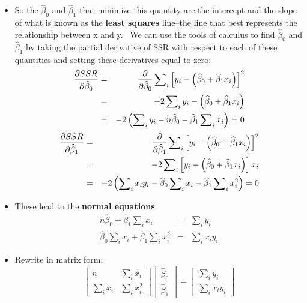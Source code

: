 \documentclass[11pt]{article}
\begin{document}
\begin{itemize}
\item So the $\widehat{\beta }_{0}$ and $\widehat{\beta }_{1}$ that minimize
this quantity are the intercept and the slope of what is known as the 
\textbf{least squares }line--the line that best represents the relationship
between x and y. \ We can use the tools of calculus to find $\widehat{\beta }%
_{0}$ and $\widehat{\beta }_{1}$ by taking the partial derivative of SSR
with respect to each of these quantities and setting these derivatives equal
to zero:%
\begin{eqnarray*}
\frac{\partial SSR}{\partial \widehat{\beta }_{0}} &=&\frac{\partial }{%
\partial \widehat{\beta }_{0}}\sum\nolimits_{i}\left[ y_{i}-\left( \widehat{%
\beta }_{0}+\widehat{\beta }_{1}x_{i}\right) \right] ^{2} \\
&=&-2\sum\nolimits_{i}y_{i}-\left( \widehat{\beta }_{0}+\widehat{\beta }%
_{1}x_{i}\right) \\
&=&-2\left( \sum\nolimits_{i}y_{i}-n\widehat{\beta }_{0}-\widehat{\beta }%
_{1}\sum\nolimits_{i}x_{i}\right) =0
\end{eqnarray*}%
\begin{eqnarray*}
\frac{\partial SSR}{\partial \widehat{\beta }_{1}} &=&\frac{\partial }{%
\partial \widehat{\beta }_{1}}\sum\nolimits_{i}\left[ y_{i}-\left( \widehat{%
\beta }_{0}+\widehat{\beta }_{1}x_{i}\right) \right] ^{2} \\
&=&-2\sum\nolimits_{i}\left[ y_{i}-\left( \widehat{\beta }_{0}+\widehat{%
\beta }_{1}x_{i}\right) \right] x_{i} \\
&=&-2\left( \sum\nolimits_{i}x_{i}y_{i}-\widehat{\beta }_{0}\sum%
\nolimits_{i}x_{i}-\widehat{\beta }_{1}\sum\nolimits_{i}x_{i}^{2}\right) =0
\end{eqnarray*}

\item These lead to the \textbf{normal equations}%
\begin{eqnarray*}
n\widehat{\beta }_{0}+\widehat{\beta }_{1}\sum\nolimits_{i}x_{i}
&=&\sum\nolimits_{i}y_{i} \\
\widehat{\beta }_{0}\sum\nolimits_{i}x_{i}+\widehat{\beta }%
_{1}\sum\nolimits_{i}x_{i}^{2} &=&\sum\nolimits_{i}x_{i}y_{i}
\end{eqnarray*}

\item Rewrite in matrix form:%
\begin{equation*}
\begin{bmatrix}
n & \sum\nolimits_{i}x_{i} \\ 
\sum\nolimits_{i}x_{i} & \sum\nolimits_{i}x_{i}^{2}%
\end{bmatrix}%
\begin{bmatrix}
\widehat{\beta }_{0} \\ 
\widehat{\beta }_{1}%
\end{bmatrix}%
=%
\begin{bmatrix}
\sum\nolimits_{i}y_{i} \\ 
\sum\nolimits_{i}x_{i}y_{i}%
\end{bmatrix}%
\end{equation*}


\end{itemize}
\end{document}
